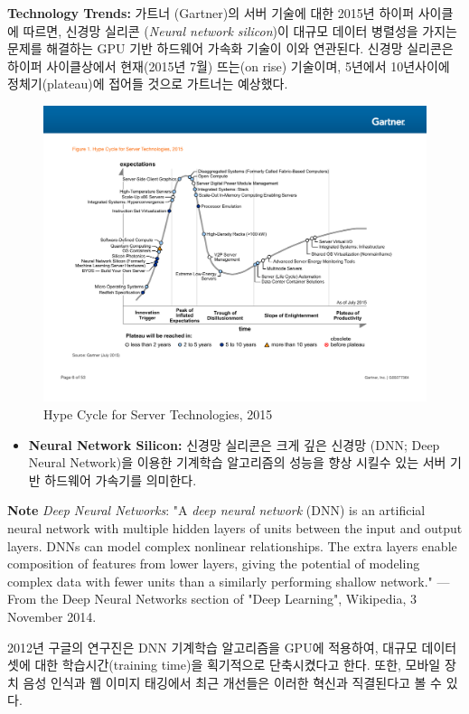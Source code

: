 \documentclass[twocolumn]{article}
\newcommand{\bi}{\begin{itemize}}
\newcommand{\ei}{\end{itemize}}
\newcommand{\ii}{\item}
\begin{document}
\noindent
\textbf{Technology Trends:}  가트너 (Gartner)의 서버 기술에 대한 2015년 하이퍼 사이클 \cite{George:2015}에 따르면, 신경망 실리콘 (\textit{Neural network silicon})이 대규모 데이터 병렬성을 가지는 문제를 해결하는 GPU 기반 하드웨어 가속화 기술이 이와 연관된다. 신경망 실리콘은 하이퍼 사이클상에서 현재(2015년 7월) 뜨는(on rise) 기술이며, 5년에서 10년사이에 정체기(plateau)에 접어들 것으로 가트너는 예상했다.
\begin{figure}[htb]
        \centering
        \includegraphics[width=1.0\textwidth]{gartner-server.pdf}
        \caption{Hype Cycle for Server Technologies, 2015 \cite{George:2015}}
        \label{fig:accelerated-data-center}
\end{figure}
\bi
\ii \textbf{Neural Network Silicon:} 신경망 실리콘은 크게 깊은 신경망 (DNN; Deep Neural Network)을 이용한 기계학습 알고리즘의 성능을 향상 시킬수 있는 서버 기반 하드웨어 가속기를 의미한다. 
\ei

\noindent
\textbf{Note}  \textit{Deep Neural Networks}: 
"A \textit{deep neural network} (DNN) is an artificial neural network with multiple hidden layers of units between the input and output layers. DNNs can model complex nonlinear relationships. The extra layers enable composition of features from lower layers, giving the potential of modeling complex data with fewer units than a similarly performing shallow network." — From the Deep Neural Networks section of "Deep Learning", Wikipedia, 3 November 2014.

2012년 구글의 연구진은 DNN 기계학습 알고리즘을 GPU에 적용하여, 대규모 데이터 셋에 대한 학습시간(training time)을 획기적으로 단축시켰다고 한다.
또한, 모바일 장치 음성 인식과 웹 이미지 태깅에서 최근 개선들은 이러한 혁신과 직결된다고 볼 수 있다.
\end{document}
